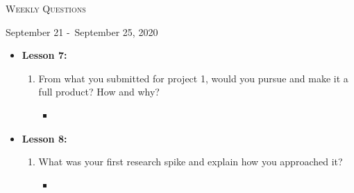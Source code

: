 \centerline{\LARGE\textsc{Weekly Questions}}
\centerline{September 21 -\ September 25, 2020}
\textbf{}
\begin{itemize}
  \item[] \textbf{\large Lesson 7:}
  \begin{enumerate}
    \item From what you submitted for project 1, would you pursue and make it a full product? How and why?
    \begin{itemize}
      \item 
    \end{itemize}
  \end{enumerate} 
\end{itemize}
\begin{itemize}
  \item[] \textbf{\large Lesson 8:}
  \begin{enumerate}
    \item What was your first research spike and explain how you approached it?
    \begin{itemize}
      \item 
    \end{itemize}
  \end{enumerate} 
\end{itemize}
